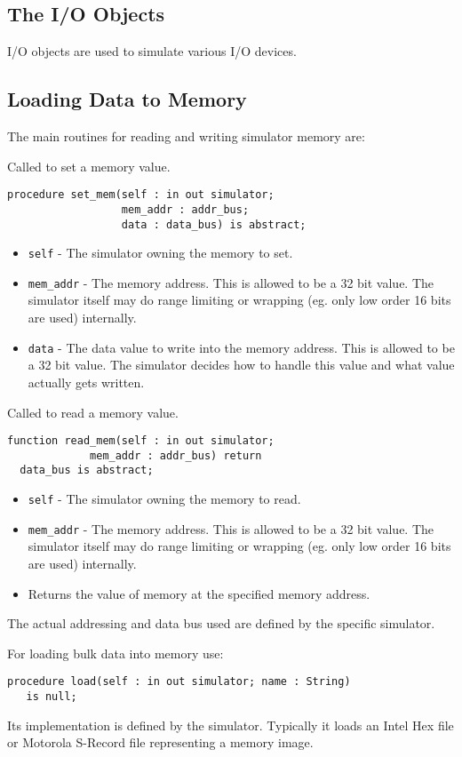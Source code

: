\documentclass[10pt, openany]{book}
\newcommand{\keyword}[1]{\texttt{#1}}
\begin{document}
\subsection{The I/O Objects}
I/O objects are used to simulate various I/O devices.

\subsection{Loading Data to Memory}
The main routines for reading and writing simulator memory are:

Called to set a memory value.
\begin{lstlisting}
procedure set_mem(self : in out simulator;
                  mem_addr : addr_bus;
                  data : data_bus) is abstract;
\end{lstlisting}
\begin{itemize}
  \item \keyword{self} - The simulator owning the memory to set.
  \item \keyword{mem\_addr} - The memory address.  This is allowed to be a 32 bit value.  The simulator itself may do range limiting or wrapping (eg. only low order 16 bits are used) internally.
  \item \keyword{data} - The data value to write into the memory address.  This is allowed to be a 32 bit value.  The simulator decides how to handle this value and what value actually gets written.
\end{itemize}
Called to read a memory value.
\begin{lstlisting}
function read_mem(self : in out simulator;
             mem_addr : addr_bus) return
  data_bus is abstract;
\end{lstlisting}
\begin{itemize}
  \item \keyword{self} - The simulator owning the memory to read.
  \item \keyword{mem\_addr} - The memory address.  This is allowed to be a 32 bit value.  The simulator itself may do range limiting or wrapping (eg. only low order 16 bits are used) internally.
  \item Returns the value of memory at the specified memory address.
\end{itemize}
The actual addressing and data bus used are defined by the specific simulator.

For loading bulk data into memory use:
\begin{lstlisting}
procedure load(self : in out simulator; name : String)
   is null;
\end{lstlisting}
Its implementation is defined by the simulator.  Typically it loads an Intel Hex file or Motorola S-Record file representing a memory image.
\end{document}
